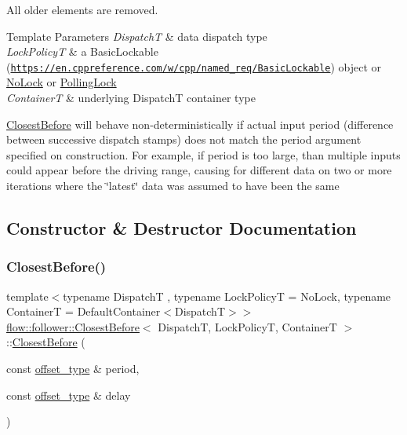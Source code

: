 All older elements are removed.


\begin{DoxyTemplParams}{Template Parameters}
{\em DispatchT} & data dispatch type \\
\hline
{\em Lock\+PolicyT} & a Basic\+Lockable (\href{https://en.cppreference.com/w/cpp/named_req/BasicLockable}{\tt https\+://en.\+cppreference.\+com/w/cpp/named\+\_\+req/\+Basic\+Lockable}) object or \hyperlink{structflow_1_1_no_lock}{No\+Lock} or \hyperlink{structflow_1_1_polling_lock}{Polling\+Lock} \\
\hline
{\em ContainerT} & underlying {\ttfamily DispatchT} container type\\
\hline
\end{DoxyTemplParams}
\hyperlink{classflow_1_1follower_1_1_closest_before}{Closest\+Before} will behave non-\/deterministically if actual input period (difference between successive dispatch stamps) does not match the {\ttfamily period} argument specified on construction. For example, if {\ttfamily period} is too large, than multiple inputs could appear before the driving range, causing for different data on two or more iterations where the \char`\"{}latest\char`\"{} data was assumed to have been the same 

\subsection{Constructor \& Destructor Documentation}
\mbox{\label{classflow_1_1follower_1_1_closest_before_a556251ee275527f2ef62330c2179570e}} 
\subsubsection{\texorpdfstring{Closest\+Before()}{ClosestBefore()}\hspace{0.1cm}{\footnotesize\ttfamily [1/2]}}
{\footnotesize\ttfamily template$<$typename DispatchT , typename Lock\+PolicyT  = No\+Lock, typename ContainerT  = Default\+Container$<$\+Dispatch\+T$>$$>$ \\
\hyperlink{classflow_1_1follower_1_1_closest_before}{flow\+::follower\+::\+Closest\+Before}$<$ DispatchT, Lock\+PolicyT, ContainerT $>$\+::\hyperlink{classflow_1_1follower_1_1_closest_before}{Closest\+Before} (\begin{DoxyParamCaption}\item[{const \hyperlink{classflow_1_1follower_1_1_closest_before_aeb5bb0a977487c9e4df80143c6dcb008}{offset\+\_\+type} \&}]{period,  }\item[{const \hyperlink{classflow_1_1follower_1_1_closest_before_aeb5bb0a977487c9e4df80143c6dcb008}{offset\+\_\+type} \&}]{delay }\end{DoxyParamCaption})}



